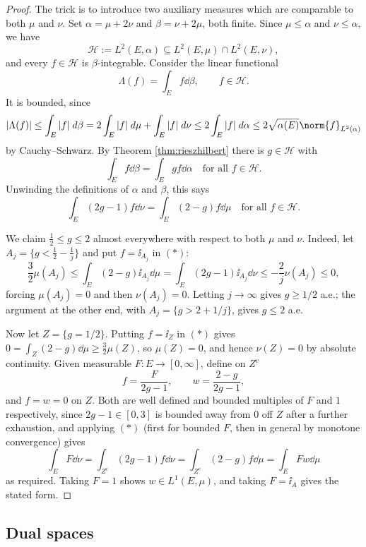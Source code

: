 \documentclass[a4paper]{scrartcl}
\newcommand{\Hil}{\mathcal{H}}
\begin{document}
\begin{proof}
	The trick is to introduce two auxiliary measures which are comparable to both $\mu$ and $\nu$. Set $\alpha = \mu + 2\nu$ and $\beta = \nu + 2\mu$, both finite. Since $\mu \le \alpha$ and $\nu \le \alpha$, we have
	$$\Hil := L^2(E,\alpha) \subseteq L^2(E,\mu) \cap L^2(E,\nu),$$
	and every $f \in \Hil$ is $\beta$-integrable. Consider the linear functional
	$$\Lambda(f) = \int_E f \dd \beta, \qquad f \in \Hil.$$
	It is bounded, since
	$$|\Lambda(f)| \le \int_E |f| \dd \beta = 2\int_E |f| \dd\mu + \int_E |f| \dd\nu \le 2\int_E |f| \dd \alpha \le 2\sqrt{\alpha(E)}\norm{f}_{L^2(\alpha)}$$
	by Cauchy--Schwarz. By Theorem \ref{thm:rieszhilbert} there is $g \in \Hil$ with
	$$\int_E f \dd \beta = \int_E gf \dd \alpha \quad \text{for all } f \in \Hil.$$
	Unwinding the definitions of $\alpha$ and $\beta$, this says
	\begin{equation*}
		\int_E (2g-1) f \dd \nu = \int_E (2 - g) f \dd \mu \quad \text{for all } f \in \Hil. \tag{$\ast$}
	\end{equation*}

	We claim $\tfrac 12 \le g \le 2$ almost everywhere with respect to both $\mu$ and $\nu$. Indeed, let $A_j = \{g < \tfrac 12 - \tfrac 1j\}$ and put $f = \ii_{A_j}$ in $(\ast)$:
	$$\frac{3}{2}\mu(A_j) \le \int_E (2-g)\ii_{A_j} \dd \mu = \int_E (2g-1)\ii_{A_j}\dd\nu \le -\frac{2}{j}\nu(A_j) \le 0,$$
	forcing $\mu(A_j) = 0$ and then $\nu(A_j) = 0$. Letting $j \to \infty$ gives $g \ge 1/2$ a.e.; the argument at the other end, with $A_j = \{g > 2 + 1/j\}$, gives $g \le 2$ a.e.

	Now let $Z = \{g = 1/2\}$. Putting $f = \ii_Z$ in $(\ast)$ gives $0 = \int_Z (2-g) \dd\mu \ge \tfrac 32 \mu(Z)$, so $\mu(Z) = 0$, and hence $\nu(Z) = 0$ by absolute continuity. Given measurable $F : E \to [0,\infty]$, define on $Z^c$
	$$f = \frac{F}{2g-1}, \qquad w = \frac{2-g}{2g-1},$$
	and $f = w = 0$ on $Z$. Both are well defined and bounded multiples of $F$ and $1$ respectively, since $2g - 1 \in [0,3]$ is bounded away from $0$ off $Z$ after a further exhaustion, and applying $(\ast)$ (first for bounded $F$, then in general by monotone convergence) gives
	$$\int_E F \dd \nu = \int_{Z^c} (2g-1)f \dd\nu = \int_{Z^c}(2-g) f \dd\mu = \int_E Fw \dd\mu$$
	as required. Taking $F = 1$ shows $w \in L^1(E,\mu)$, and taking $F = \ii_A$ gives the stated form.
\end{proof}

\subsection{Dual spaces}
\end{document}
